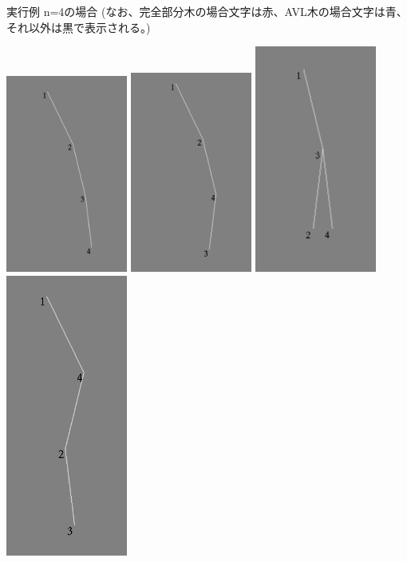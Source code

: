 \documentclass{ltjsarticle}
\begin{document}
\textrm{実行例 n=4の場合 (なお、完全部分木の場合文字は赤、AVL木の場合文字は青、それ以外は黒で表示される。)}

\includegraphics[width=4cm]{2.png}
\includegraphics[width=4cm]{3.png}
\includegraphics[width=4cm]{4.png}
\includegraphics[width=4cm]{5.png}
\end{document}
